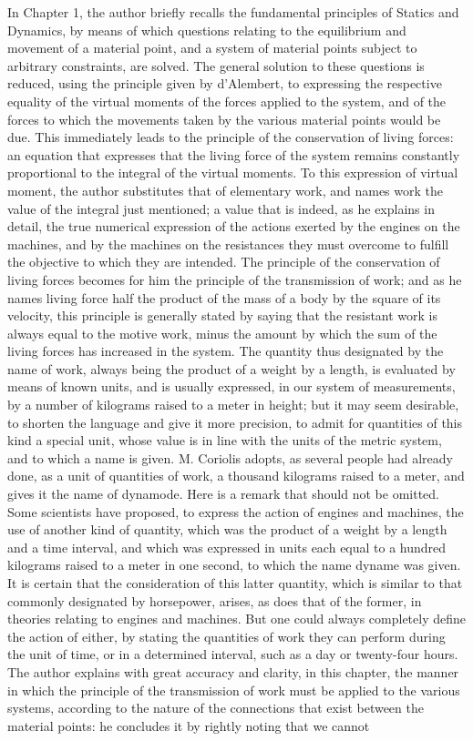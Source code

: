 \documentclass{book}
\begin{document}
In Chapter 1, the author briefly recalls the fundamental principles of Statics and Dynamics, by means of which questions relating to the equilibrium and movement of a material point, and a system of material points subject to arbitrary constraints, are solved. The general solution to these questions is reduced, using the principle given by d'Alembert, to expressing the respective equality of the virtual moments of the forces applied to the system, and of the forces to which the movements taken by the various material points would be due. This immediately leads to the principle of the conservation of living forces: an equation that expresses that the living force of the system remains constantly proportional to the integral of the virtual moments. To this expression of virtual moment, the author substitutes that of elementary work, and names work the value of the integral just mentioned; a value that is indeed, as he explains in detail, the true numerical expression of the actions exerted by the engines on the machines, and by the machines on the resistances they must overcome to fulfill the objective to which they are intended. The principle of the conservation of living forces becomes for him the principle of the transmission of work; and as he names living force half the product of the mass of a body by the square of its velocity, this principle is generally stated by saying that the resistant work is always equal to the motive work, minus the amount by which the sum of the living forces has increased in the system. The quantity thus designated by the name of work, always being the product of a weight by a length, is evaluated by means of known units, and is usually expressed, in our system of measurements, by a number of kilograms raised to a meter in height; but it may seem desirable, to shorten the language and give it more precision, to admit for quantities of this kind a special unit, whose value is in line with the units of the metric system, and to which a name is given. M. Coriolis adopts, as several people had already done, as a unit of quantities of work, a thousand kilograms raised to a meter, and gives it the name of dynamode. Here is a remark that should not be omitted. Some scientists have proposed, to express the action of engines and machines, the use of another kind of quantity, which was the product of a weight by a length and a time interval, and which was expressed in units each equal to a hundred kilograms raised to a meter in one second, to which the name dyname was given. It is certain that the consideration of this latter quantity, which is similar to that commonly designated by horsepower, arises, as does that of the former, in theories relating to engines and machines. But one could always completely define the action of either, by stating the quantities of work they can perform during the unit of time, or in a determined interval, such as a day or twenty-four hours. The author explains with great accuracy and clarity, in this chapter, the manner in which the principle of the transmission of work must be applied to the various systems, according to the nature of the connections that exist between the material points: he concludes it by rightly noting that we cannot 
\end{document}
